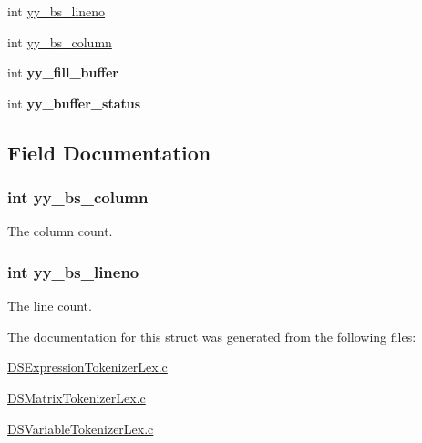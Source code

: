\begin{DoxyCompactItemize}
\item 
int \hyperlink{structyy__buffer__state_a59c414c619ca0071fe3a091336106d82}{yy\_\-bs\_\-lineno}
\item 
int \hyperlink{structyy__buffer__state_ad9867983bbc1666304d83623cd6e3dd8}{yy\_\-bs\_\-column}
\item 
\hypertarget{structyy__buffer__state_a5e492694db97a0d7760d8cc5fd058dfd}{
int {\bfseries yy\_\-fill\_\-buffer}}
\label{structyy__buffer__state_a5e492694db97a0d7760d8cc5fd058dfd}

\item 
\hypertarget{structyy__buffer__state_a6ca09e676a787676260c558a0f731285}{
int {\bfseries yy\_\-buffer\_\-status}}
\label{structyy__buffer__state_a6ca09e676a787676260c558a0f731285}

\end{DoxyCompactItemize}


\subsection{Field Documentation}
\hypertarget{structyy__buffer__state_ad9867983bbc1666304d83623cd6e3dd8}{
\subsubsection[{yy\_\-bs\_\-column}]{\setlength{\rightskip}{0pt plus 5cm}int {\bf yy\_\-bs\_\-column}}}
\label{structyy__buffer__state_ad9867983bbc1666304d83623cd6e3dd8}
The column count. \hypertarget{structyy__buffer__state_a59c414c619ca0071fe3a091336106d82}{
\subsubsection[{yy\_\-bs\_\-lineno}]{\setlength{\rightskip}{0pt plus 5cm}int {\bf yy\_\-bs\_\-lineno}}}
\label{structyy__buffer__state_a59c414c619ca0071fe3a091336106d82}
The line count. 

The documentation for this struct was generated from the following files:\begin{DoxyCompactItemize}
\item 
\hyperlink{_d_s_expression_tokenizer_lex_8c}{DSExpressionTokenizerLex.c}\item 
\hyperlink{_d_s_matrix_tokenizer_lex_8c}{DSMatrixTokenizerLex.c}\item 
\hyperlink{_d_s_variable_tokenizer_lex_8c}{DSVariableTokenizerLex.c}\end{DoxyCompactItemize}
